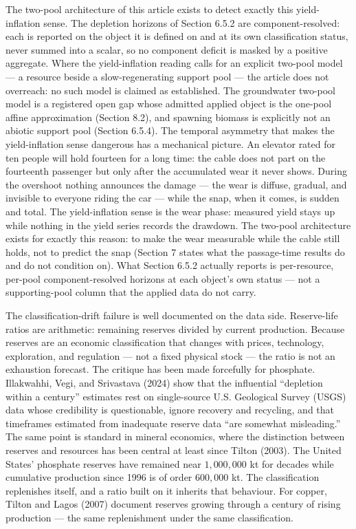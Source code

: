 \documentclass[11pt]{article}
\begin{document}
The two-pool architecture of this article exists to detect exactly this
yield-inflation sense. The depletion horizons of Section 6.5.2 are
component-resolved: each is reported on the object it is defined on and
at its own classification status, never summed into a scalar, so no
component deficit is masked by a positive aggregate. Where the
yield-inflation reading calls for an explicit two-pool model --- a
resource beside a slow-regenerating support pool --- the article does
not overreach: no such model is claimed as established. The groundwater
two-pool model is a registered open gap whose admitted applied object is
the one-pool affine approximation (Section 8.2), and spawning biomass is
explicitly not an abiotic support pool (Section 6.5.4). The temporal
asymmetry that makes the yield-inflation sense dangerous has a
mechanical picture. An elevator rated for ten people will hold fourteen
for a long time: the cable does not part on the fourteenth passenger but
only after the accumulated wear it never shows. During the overshoot
nothing announces the damage --- the wear is diffuse, gradual, and
invisible to everyone riding the car --- while the snap, when it comes,
is sudden and total. The yield-inflation sense is the wear phase:
measured yield stays up while nothing in the yield series records the
drawdown. The two-pool architecture exists for exactly this reason: to
make the wear measurable while the cable still holds, not to predict the
snap (Section 7 states what the passage-time results do and do not
condition on). What Section 6.5.2 actually reports is per-resource,
per-pool component-resolved horizons at each object's own status --- not
a supporting-pool column that the applied data do not carry.

The classification-drift failure is well documented on the data side.
Reserve-life ratios are arithmetic: remaining reserves divided by
current production. Because reserves are an economic classification that
changes with prices, technology, exploration, and regulation --- not a
fixed physical stock --- the ratio is not an exhaustion forecast. The
critique has been made forcefully for phosphate. Illakwahhi, Vegi, and
Srivastava (2024) show that the influential ``depletion within a
century'' estimates rest on single-source U.S. Geological Survey (USGS)
data whose credibility is questionable, ignore recovery and recycling,
and that timeframes estimated from inadequate reserve data ``are
somewhat misleading.'' The same point is standard in mineral economics,
where the distinction between reserves and resources has been central at
least since Tilton (2003). The United States' phosphate reserves have
remained near \(1{,}000{,}000\) kt for decades while cumulative
production since 1996 is of order \(600{,}000\) kt. The classification
replenishes itself, and a ratio built on it inherits that behaviour. For
copper, Tilton and Lagos (2007) document reserves growing through a
century of rising production --- the same replenishment under the same
classification.
\end{document}
